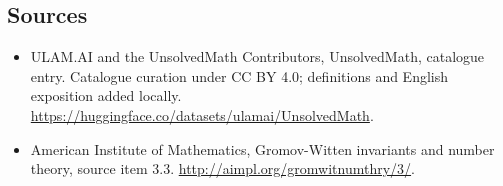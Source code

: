 \documentclass[11pt]{article}
\begin{document}
\subsection{Sources}
\begin{itemize}
\item[\hypertarget{source:statement:1}{S1}] ULAM.AI and the UnsolvedMath Contributors, UnsolvedMath, catalogue entry. Catalogue curation under CC BY 4.0; definitions and English exposition added locally.
\url{https://huggingface.co/datasets/ulamai/UnsolvedMath}.
\item[\hypertarget{source:statement:2}{S2}] American Institute of Mathematics, Gromov-Witten invariants and number theory, source item 3.3.
\url{http://aimpl.org/gromwitnumthry/3/}.
\end{itemize}
\label{end:statement}
\end{document}
